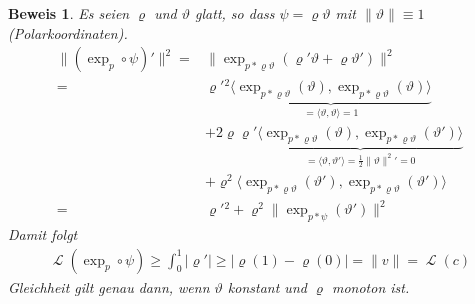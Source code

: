 \documentclass[paper=A4, twoside, chapterprefix=true, bibliography=totoc, headsepline]{scrbook}
\let\temp\phi{}
\let\phi\varphi{}
\let\varphi\temp{}
\let\temp\theta{}
\let\theta\vartheta{}
\let\vartheta\temp{}
\let\temp\epsilon{}
\let\epsilon\varepsilon{}
\let\varepsilon\temp{}
\let\temp\rho{}
\let\rho\varrho{}
\let\varrho\temp{}
\DeclareMathOperator{\calL}{\mathcal{L}}
\theoremstyle{plain}
\theoremstyle{nonumberplain}
\newtheorem{bew}{Beweis}
\theoremstyle{empty}
\theoremstyle{break}
\begin{document}
\begin{bew}
  Es seien $\rho$ und $\theta$ glatt, so dass $\psi = \rho \theta$ mit $\|\theta\| \equiv 1$ (Polarkoordinaten).
  \begin{align*}
    \|(\exp_p \circ \psi)'\|^2 ={}& \|\exp_{p*\rho\theta} ( \rho' \theta + \rho \theta') \|^2 \\
    ={}& {\rho'}{^2} \underbrace{\langle \exp_{p*\rho\theta} (\theta), \exp_{p*\rho\theta} (\theta) \rangle}_{= \langle \theta, \theta \rangle = 1} \\
    & + 2\rho\rho' \underbrace{\langle \exp_{p*\rho\theta} (\theta), \exp_{p*\rho\theta} (\theta') \rangle}_{= \langle \theta, \theta' \rangle = \frac{1}{2} \|\theta\|^2{'} = 0} \\
    & + \rho^2 \langle \exp_{p*\rho\theta} (\theta'), \exp_{p*\rho\theta} (\theta') \rangle \\
    ={}& {\rho'}{^2} + \rho^2 \| \exp_{p*\psi}(\theta') \|^2
  \end{align*}
  Damit folgt
  \begin{align*}
    \calL(\exp_p \circ \psi) \ge \int_0^1 | \rho' | \ge | \rho(1) - \rho(0) | = \|v\| = \calL(c)
  \end{align*}
  Gleichheit gilt genau dann, wenn $\theta$ konstant und $\rho$ monoton ist.
\end{bew}
\end{document}
